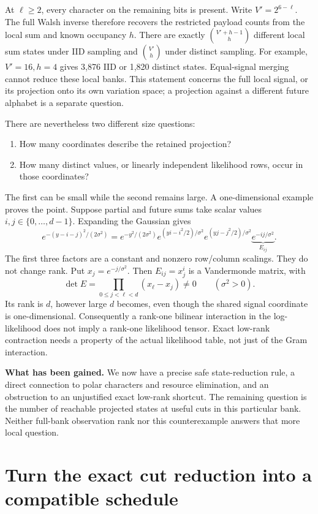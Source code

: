\documentclass[10pt,a4paper]{article}
\begin{document}
At $\ell\geq2$, every character on the remaining bits is present. Write $V'=2^{6-\ell}$.
The full Walsh inverse therefore recovers the restricted payload counts from the local sum and known occupancy
$h$. There are exactly $\binom{V'+h-1}{h}$ different local sum states under IID sampling and $\binom{V'}h$
under distinct sampling. For example, $V'=16,h=4$ gives 3,876 IID or 1,820 distinct states.
Equal-signal merging cannot reduce these local banks. This statement concerns the full local signal, or its
projection onto its own variation space; a projection against a different future alphabet is a separate question.

There are nevertheless two different size questions:
\begin{enumerate}
\item How many coordinates describe the retained projection?
\item How many distinct values, or linearly independent likelihood rows, occur in those coordinates?
\end{enumerate}
The first can be small while the second remains large. A one-dimensional example proves the point.
Suppose partial and future sums take scalar values $i,j\in\{0,\ldots,d-1\}$. Expanding the Gaussian gives
\[
 e^{-(y-i-j)^2/(2\sigma^2)}
 = e^{-y^2/(2\sigma^2)}
   e^{(yi-i^2/2)/\sigma^2}e^{(yj-j^2/2)/\sigma^2}
   \underbrace{e^{-ij/\sigma^2}}_{E_{ij}}.
\]
The first three factors are a constant and nonzero row/column scalings. They do not change rank.
Put $x_j=e^{-j/\sigma^2}$. Then $E_{ij}=x_j^i$ is a Vandermonde matrix, with
\[
 \det E=\prod_{0\leq j<\ell<d}(x_\ell-x_j)\ne0
 \qquad(\sigma^2>0).
\]
Its rank is $d$, however large $d$ becomes, even though the shared signal coordinate is one-dimensional.
Consequently a rank-one bilinear interaction in the log-likelihood does not imply a rank-one likelihood tensor.
Exact low-rank contraction needs a property of the actual likelihood table, not just of the Gram interaction.

\textbf{What has been gained.} We now have a precise safe state-reduction rule, a direct connection to polar
characters and resource elimination, and an obstruction to an unjustified exact low-rank shortcut.
The remaining question is the number of reachable projected states at useful cuts in this particular bank.
Neither full-bank observation rank nor this counterexample answers that more local question.

\clearpage
\section{Turn the exact cut reduction into a compatible schedule}
\label{sec:nested-schedule}
\end{document}
